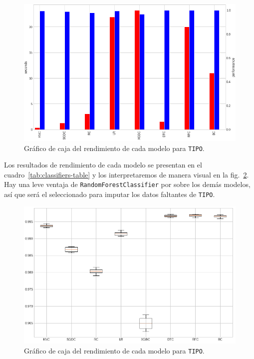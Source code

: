 \documentclass[a4paper,12pt]{article}
\begin{document}
\begin{figure}[H]
	\begin{center}
	\includegraphics[width=1\textwidth]{tipotimes.png}
  	\caption{Gráfico de caja del rendimiento de cada modelo para \texttt{TIPO}.}
  	\label{fig:modeltxtipo}
  	\end{center}
\end{figure}

Los resultados de rendimiento de cada modelo se presentan en el cuadro~\ref{tab:classifiers-table} y los interpretaremos de manera visual en la fig.~\ref{fig:boxplotmodeltype}. Hay una leve ventaja de \texttt{RandomForestClassifier} por sobre los demás modelos, así que será el seleccionado para imputar los datos faltantes de \texttt{TIPO}.

\begin{figure}[H]
	\begin{center}
	\includegraphics[width=1\textwidth]{tipoperf.png}
  	\caption{Gráfico de caja del rendimiento de cada modelo para \texttt{TIPO}.}
  	\label{fig:boxplotmodeltype}
  	\end{center}
\end{figure}
\end{document}
